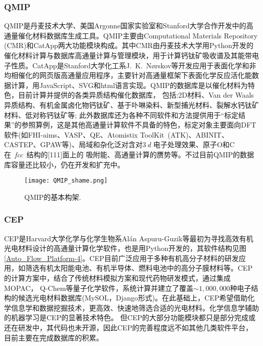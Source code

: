 \subsubsection{\rm{QMIP}}
\textrm{QMIP}是丹麦技术大学、美国\textrm{Argonne}国家实验室和\textrm{Stanford}大学合作开发中的高通量催化材料数据库生成工具。\textrm{QMIP}主要由\textrm{Computational Materials Repository (CMR)}和\textrm{CatApp}两大功能模块构成。其中\textrm{CMR}由丹麦技术大学用\textrm{Python}开发的催化材料计算与数据库高通量计算与管理模块，用于计算钙钛矿吸收谱及其能带电子性质。\textrm{CatApp}是\textrm{Stanford}大学化工系\textrm{J.~K.~N{\o}rskov}等开发应用于表面化学和非均相催化的网页版高通量应用程序，主要针对高通量框架下表面化学反应活化能数据计算，用\textrm{JavaScript}、\textrm{SVG}和\textrm{html}语言实现。\textrm{QMIP}的数据库是以催化材料为特色，目前计算并提供的各类异质结构催化数据库， 包括:\textrm{2D}材料、\textrm{Van der Waals}异质结构、有机金属卤化物钙钛矿、基于卟啉染料、新型捕光材料、裂解水钙钛矿材料、低对称钙钛矿等; 此外数据库还为各种不同软件和方法提供用于“标定结果”的参照算例，这是其他高通量计算软件不具备的特色，标定对象主要面向\textrm{DFT}软件(如\textrm{FHI-aims}、\textrm{VASP}、\textrm{QE}、\textrm{Atomistix ToolKit~(ATK)}、\textrm{ABINIT}、\textrm{CASTEP}、GPAW等)、局域和杂化泛对含对3\,\textit{d} 电子处理效果、原子\textrm{O}和\textrm{C}在~\textit{fcc}~结构的[111]面上的 吸附能、高通量计算的赝势等。不过目前\textrm{QMIP}的数据库容量还比较小，仍在开发和扩充中。
\begin{figure}[h!]
\centering
\texttt{[image: QMIP\_shame.png]}%
\caption{\textrm{QMIP}的基本构架.}%
\label{Auto_Flow_Platform-3}
\end{figure}

\subsubsection{\rm{CEP}}
\textrm{CEP}是\textrm{Harvard}大学化学与化学生物系\textrm{Al{\'a}n Aspuru-Guzik}等最初为寻找高效有机光电材料设计的高通量计算化学软件，也是用\textrm{Python}开发的，其软件结构见图\ref{Auto_Flow_Platform-4}。\textrm{CEP}目前广泛应用于多种有机高分子材料的研发应用，如筛选有机太阳能电池、有机半导体、燃料电池中的高分子膜材料等。\textrm{CEP}的计算方案中，结合了传统材料模拟方案和现代药物研发模式，通过集成\textrm{MOPAC}， \textrm{Q-Chem}等量子化学软件，系统计算并建立了覆盖$\sim1,000,000$种电子结构的候选光电材料数据库(\textrm{MySOL}，\textrm{Django}形式)。在此基础上，\textrm{CEP}希望借助化学信息学和数据挖掘技术，更高效、快速地筛选合适的光电材料。化学信息学辅助的机器学习是\textrm{CEP}的显著技术特色。 但\textrm{CEP}的大部分功能模块都只是部分完成或还在研发中，其代码也未开源，因此\textrm{CEP}的完善程度远不如其他几类软件平台，目前主要在完成数据库的积累。 

